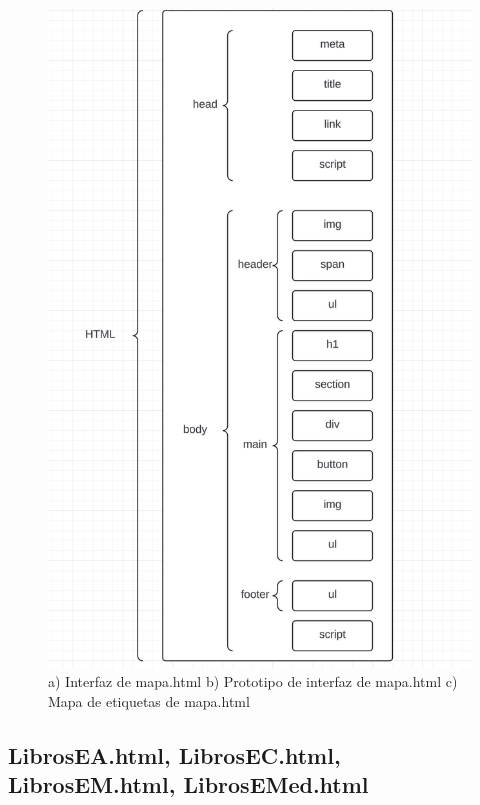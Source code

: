 \documentclass{article}
\begin{document}
\begin{figure}[H]
\begin{minipage}{0.49\textwidth}
    \end{minipage}
    
    \vspace{5mm}
    
    \includegraphics[width=\textwidth, height=0.5\textheight, keepaspectratio]{htmlFotos/MEAH.jpg}
    \caption{a) Interfaz de mapa.html b) Prototipo de interfaz de mapa.html c) Mapa de etiquetas de mapa.html}
    \label{fig:imagenes_conjuntas}
\end{figure}

\subsection*{LibrosEA.html, LibrosEC.html, LibrosEM.html, LibrosEMed.html}
\end{document}
